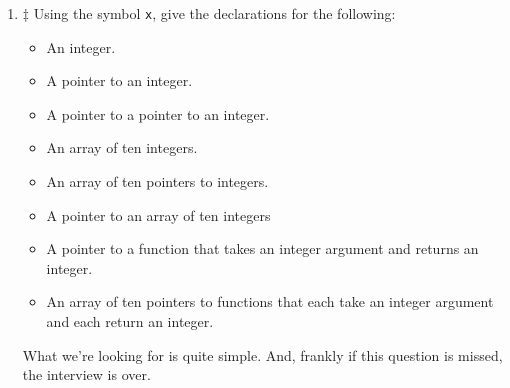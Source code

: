 \documentclass[12pt]{article}
\newcommand{\cCC}{{\texttt{C/C++}}}%
\newcommand{\cC}{{\texttt{C}}}%
\begin{document}
\begin{enumerate}
Now, the first answer usually indicates a very correct answer that works everywhere that {\texttt{1}} means true.
In some languages like {\texttt{C\#}}, this would not be the case.  In \cCC\ it will work fine.
This candidate would fit in fine and would be able to survive anywhere.

\par
The next one -- the {\texttt{for}} loop is also OK.  It's a little pedantic.  People will understand it.  But it's
not what we hope to see.  It works, it's not incorrect.  But the syntax isn't clean in meaning by reading it.
\par

The last one -- {\texttt{goto}} ... Now this is a two edged sword.  It would be odd to get this answer
{\textit{unless}} they were an assembly language developer at heart.  That's good and bad.  It's good that
they are experienced at low level software.  It's bad because we haven't discovered if they know enough about \cC.  If you get this answer -- be careful with this candidate to fully understand 
their \cC\ experience.


\item $\ddagger$ Using the symbol {\texttt{x}}, give the declarations for the following:
\begin{itemize}
\item An integer.
\item A pointer to an integer.
\item A pointer to a pointer to an integer.
\item An array of ten integers.
\item An array of ten pointers to integers.
\item A pointer to an array of ten integers
\item A pointer to a function that takes an integer argument  and returns an integer.
\item An array of ten pointers to functions that each take an integer argument and each return an integer.
\end{itemize}

What we're looking for is quite simple.  And, frankly if this question is missed, the interview is over.


\end{enumerate}
\end{document}
